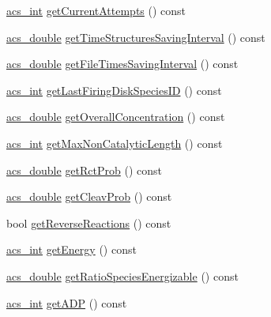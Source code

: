 \begin{DoxyCompactItemize}
\hyperlink{acs__headers_8h_a8d277355641a098190360234e2ebde35}{acs\-\_\-int} \hyperlink{classenvironment_a0851e3481e6fec7f4feef126d5a6704c}{get\-Current\-Attempts} () const 
\item 
\hyperlink{acs__headers_8h_ab776853a005fcbf56af0424a2a4dd607}{acs\-\_\-double} \hyperlink{classenvironment_a892dd7bd29342c4206c39556d91a83da}{get\-Time\-Structures\-Saving\-Interval} () const 
\item 
\hyperlink{acs__headers_8h_ab776853a005fcbf56af0424a2a4dd607}{acs\-\_\-double} \hyperlink{classenvironment_a77e995bee54ab4e09f165a857a7b0272}{get\-File\-Times\-Saving\-Interval} () const 
\item 
\hyperlink{acs__headers_8h_a8d277355641a098190360234e2ebde35}{acs\-\_\-int} \hyperlink{classenvironment_a984f79e5f89b774b65db901899687ac0}{get\-Last\-Firing\-Disk\-Species\-I\-D} () const 
\item 
\hyperlink{acs__headers_8h_ab776853a005fcbf56af0424a2a4dd607}{acs\-\_\-double} \hyperlink{classenvironment_a8bea373c48982a78ee46c5c5fafcb81c}{get\-Overall\-Concentration} () const 
\item 
\hyperlink{acs__headers_8h_a8d277355641a098190360234e2ebde35}{acs\-\_\-int} \hyperlink{classenvironment_aca760caf9354f541020c1db58490b18f}{get\-Max\-Non\-Catalytic\-Length} () const 
\item 
\hyperlink{acs__headers_8h_ab776853a005fcbf56af0424a2a4dd607}{acs\-\_\-double} \hyperlink{classenvironment_ae244aa972cf10c103b8b20d95703831f}{get\-Rct\-Prob} () const 
\item 
\hyperlink{acs__headers_8h_ab776853a005fcbf56af0424a2a4dd607}{acs\-\_\-double} \hyperlink{classenvironment_ac728f6ab012c42fa85a2e2f70df7dc58}{get\-Cleav\-Prob} () const 
\item 
bool \hyperlink{classenvironment_a2a2ac2a8140df67688a71d3349adf04a}{get\-Reverse\-Reactions} () const 
\item 
\hyperlink{acs__headers_8h_a8d277355641a098190360234e2ebde35}{acs\-\_\-int} \hyperlink{classenvironment_ab463a460de102c79c1044ab8a2c176ae}{get\-Energy} () const 
\item 
\hyperlink{acs__headers_8h_ab776853a005fcbf56af0424a2a4dd607}{acs\-\_\-double} \hyperlink{classenvironment_a4fcc6030b68a37bedff870b9c48c188d}{get\-Ratio\-Species\-Energizable} () const 
\item 
\hyperlink{acs__headers_8h_a8d277355641a098190360234e2ebde35}{acs\-\_\-int} \hyperlink{classenvironment_a69d18914fe7c8e96b10992668960b83b}{get\-A\-D\-P} () const 
\item 

\end{DoxyCompactItemize}
